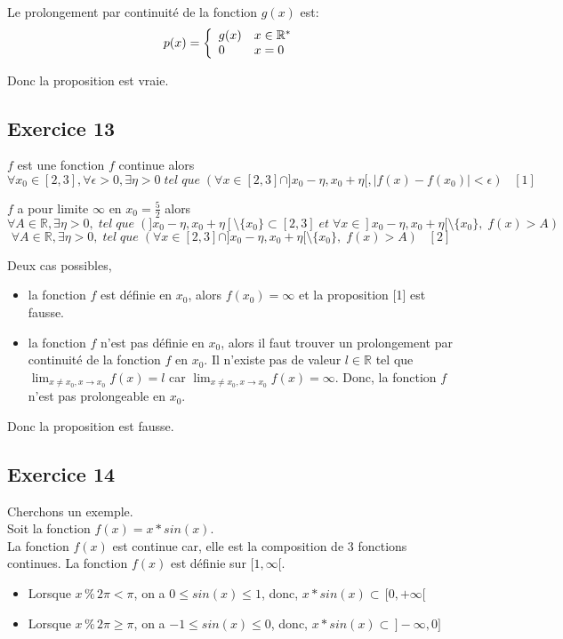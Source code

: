 \documentclass[]{book}
\theoremstyle{definition}
\newcommand{\bb}[1]{\mathbb{#1}}
\newcommand{\R}{\bb{R}}
\begin{document}
Le prolongement par continuit\'e de la fonction $g(x)$ est: 
$$p(x) = 
\left\{ 
\begin{array}{l l}
 g(x) & x \in \R^{*}\\
 0 & x = 0\\
\end{array}
\right. 
$$

Donc la proposition est vraie.


\subsection*{Exercice 13}
$f$ est une fonction $f$ continue alors 
$$\forall x_0 \in [2,3], \forall \epsilon >0, \exists \eta > 0\; tel\; que\; (\forall x \in [2,3] \cap ]x_0-\eta, x_0+\eta[, |f(x)-f(x_0)| < \epsilon) \;\;\; [1]$$ 

$f$ a pour limite $\infty$ en $x_0=\frac{5}{2}$ alors
$$\forall A \in \R, \exists \eta > 0,\; tel\; que\; (]x_0-\eta, x_0+\eta[ \setminus \{x_0\} \subset [2,3] \; et \; \forall x \in ]x_0-\eta, x_0+\eta[ \setminus \{x_0\},\; f(x) > A)$$
$$\forall A \in \R, \exists \eta > 0,\; tel\; que\; (\forall x \in [2,3] \cap ]x_0-\eta, x_0+\eta[ \setminus \{x_0\}, \; f(x) > A) \;\;\; [2]$$

Deux cas possibles, 
\begin{itemize}
\item la fonction $f$ est d\'efinie en $x_0$, alors $f(x_0) = \infty$ et la proposition [1] est fausse.
\item la fonction $f$ n'est pas d\'efinie en $x_0$, alors il faut trouver un prolongement par continuit\'e de la fonction $f$ en $x_0$. Il n'existe pas de valeur $l \in \R$ tel que $\lim_{x \neq x_0, x \to x_0} f(x) = l$ car $\lim_{x \neq x_0, x \to x_0} f(x) = \infty$. Donc,  la fonction $f$ n'est pas prolongeable en $x_0$.
\end{itemize}


Donc la proposition est fausse.


\subsection*{Exercice 14}
Cherchons un exemple.\\
Soit la fonction $f(x) = x*sin(x)$.\\
La fonction $f(x)$ est continue car, elle est la composition de 3 fonctions continues. La fonction $f(x)$ est d\'efinie sur $[1,\infty[$.

\begin{itemize}
\item  Lorsque $x\, \% \, 2\pi < \pi$, on a $0 \le sin(x) \le 1$, donc, $x*sin(x) \subset\, [0,+\infty[$
\item  Lorsque $x\, \% \, 2\pi \ge \pi$, on a $-1 \le sin(x) \le 0$, donc, $x*sin(x) \subset\, ]-\infty,0]$
\end{itemize}
\end{document}
